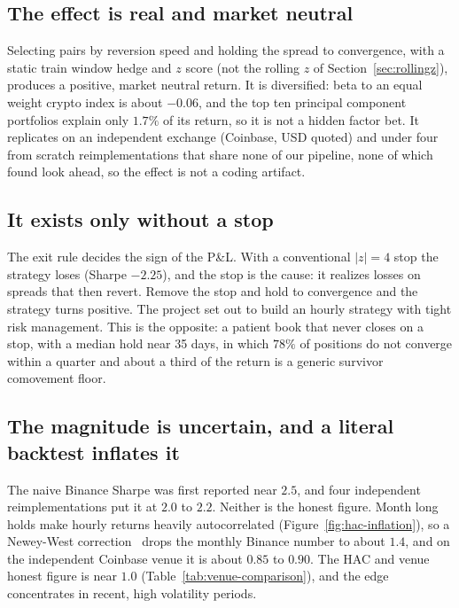 \documentclass[11pt]{article}
\begin{document}
\subsection{The effect is real and market neutral}

Selecting pairs by reversion speed and holding the spread to convergence, with a static
train window hedge and $z$ score (not the rolling $z$ of Section~\ref{sec:rollingz}), produces a
positive, market neutral return. It is diversified: beta to an equal weight crypto index is about $-0.06$,
and the top ten principal component portfolios explain only $1.7\%$ of its return, so it is not a
hidden factor bet. It replicates on an independent exchange (Coinbase, USD quoted) and under four
from scratch reimplementations that share none of our pipeline, none of which found look ahead,
so the effect is not a coding artifact.

\subsection{It exists only without a stop}

The exit rule decides the sign of the P\&L. With a conventional $|z| = 4$ stop the strategy loses
(Sharpe $-2.25$), and the stop is the cause: it realizes losses on spreads that then revert.
Remove the stop and hold to convergence and the strategy turns positive. The project set out to
build an hourly strategy with tight risk management. This is the opposite: a patient book that
never closes on a stop, with a median hold near 35 days, in which $78\%$ of positions do not converge within a quarter and
about a third of the return is a generic survivor comovement floor.

\subsection{The magnitude is uncertain, and a literal backtest inflates it}

The naive Binance Sharpe was first reported near $2.5$, and four independent reimplementations put
it at $2.0$ to $2.2$. Neither is the honest figure. Month long holds make hourly returns heavily
autocorrelated (Figure~\ref{fig:hac-inflation}), so a Newey-West correction~\cite{newey1987hac}
drops the monthly Binance number to about $1.4$, and
on the independent Coinbase venue it is about $0.85$ to $0.90$. The HAC and venue honest figure
is near $1.0$ (Table~\ref{tab:venue-comparison}), and the edge concentrates in recent, high volatility periods.
\end{document}
